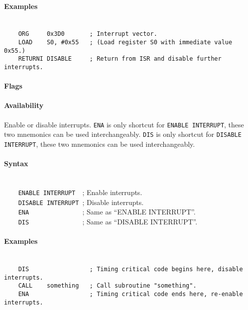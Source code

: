         \paragraph{Examples}
            ~\\
            \verb'    ORG     0x3D0       ; Interrupt vector.'\\
            \verb'    LOAD    S0, #0x55   ; (Load register S0 with immediate value 0x55.)'\\
            \verb'    RETURNI DISABLE     ; Return from ISR and disable further interrupts.'

        \paragraph{Flags}

        \paragraph{Availability}
            \pbavailability{\yes}{\yes}{\yes}{\yes}{\yes}

    \clearpage
        Enable or disable interrupts. \texttt{ENA} is only shortcut for \texttt{ENABLE INTERRUPT}, these two mnemonics can be used interchangeably. \texttt{DIS} is only shortcut for \texttt{DISABLE INTERRUPT}, these two mnemonics can be used interchangeably.

        \paragraph{Syntax}
            ~\\
            \verb'    ENABLE INTERRUPT  '; Enable interrupts.\\
            \verb'    DISABLE INTERRUPT '; Disable interrupts.\\
            \verb'    ENA               '; Same as ``ENABLE INTERRUPT''.\\
            \verb'    DIS               '; Same as ``DISABLE INTERRUPT''.

        \paragraph{Examples}
            ~\\
            \verb'    DIS                 ; Timing critical code begins here, disable interrupts.'\\
            \verb'    CALL    something   ; Call subroutine "something".'\\
            \verb'    ENA                 ; Timing critical code ends here, re-enable interrupts.'

